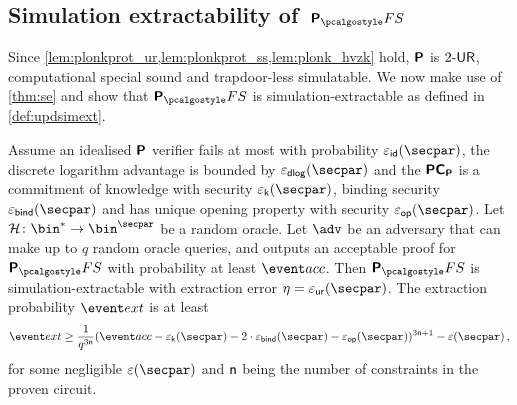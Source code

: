 
\subsection{Simulation extractability of~$\plonkprotfs$}
Since \cref{lem:plonkprot_ur,lem:plonkprot_ss,lem:plonk_hvzk} hold, $\bm{\mathsf{P}}$ is ${2\text{-}\mathsf{UR}}$,
computational special sound and trapdoor-less simulatable. We now make use of \cref{thm:se} and show that
$\plonkprot_\fs$ is simulation-extractable as defined in \cref{def:updsimext}.

\begin{corollary}
\label{thm:plonkprotfs_se}
Assume an idealised $\bm{\mathsf{P}}$ verifier fails at most with probability
$\epsid(\secpar)$, the discrete logarithm advantage is bounded by $\epsdlog(\secpar)$ and
the $\bm{\mathsf{PC}}_{\bm{\mathsf{P}}}$ is a commitment of knowledge with security $\epsk(\secpar)$, binding security
$\epsbind(\secpar)$ and has unique opening property with security $\epsop(\secpar)$. Let
$\ro\colon \bin^* \to \bin^\secpar$ be a random oracle. Let $\advse$ be an adversary that
can make up to $q$ random oracle queries, and outputs an acceptable proof for
$\plonkprotfs$ with probability at least $\accProb$. Then $\plonkprotfs$ is
simulation-extractable with extraction error \textcolor{red}{$\eta =
\epsur(\secpar)$}. The extraction probability $\extProb$ is at least
\[
	\extProb \geq \frac{1}{q^{3 \noofc}} (\accProb - \epsk(\secpar) - 2\cdot\epsbind(\secpar) -
  \epsop(\secpar))^{3\noofc + 1} -\eps(\secpar)\,,
\]
for some negligible $\eps(\secpar)$ and $\mathsf{n}$ being the number of
constraints in the proven circuit.
\end{corollary}
 
